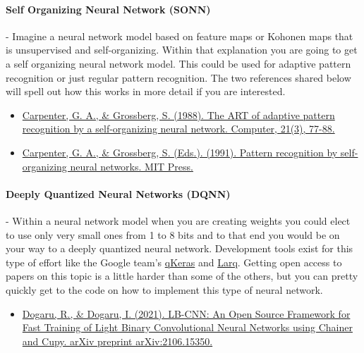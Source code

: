 \documentclass{article}
\begin{document}
\paragraph{Self Organizing Neural Network (SONN)} - Imagine a neural network model based on feature maps or Kohonen maps that is unsupervised and self-organizing. Within that explanation you are going to get a self organizing neural network model. This could be used for adaptive pattern recognition or just regular pattern recognition. The two references shared below will spell out how this works in more detail if you are interested. 

\begin{itemize}
\item \href{https://search.iczhiku.com/paper/bELWExDU1wAMpDkP.pdf}{Carpenter, G. A., \& Grossberg, S. (1988). The ART of adaptive pattern recognition by a self-organizing neural network. Computer, 21(3), 77-88.} \cite{carpenter1988art}
\item \href{https://www.google.com/books/edition/Pattern_Recognition_by_Self_organizing_N/2u1fH0mxfz0C?hl=en&gbpv=0}{Carpenter, G. A., \& Grossberg, S. (Eds.). (1991). Pattern recognition by self-organizing neural networks. MIT Press.} \cite{carpenter1988art}
\end{itemize}

\paragraph{Deeply Quantized Neural Networks (DQNN)} - Within a neural network model when you are creating weights you could elect to use only very small ones from 1 to 8 bits and to that end you would be on your way to a deeply quantized neural network. Development tools exist for this type of effort like the Google team’s \href{https://github.com/google/qkeras}{qKeras} and \href{https://github.com/larq/larq }{Larq}. Getting open access to papers on this topic is a little harder than some of the others, but you can pretty quickly get to the code on how to implement this type of neural network. 

\begin{itemize}
\item \href{https://arxiv.org/ftp/arxiv/papers/2106/2106.15350.pdf}{Dogaru, R., \& Dogaru, I. (2021). LB-CNN: An Open Source Framework for Fast Training of Light Binary Convolutional Neural Networks using Chainer and Cupy. arXiv preprint arXiv:2106.15350.} \cite{dogaru2021lb}
\end{itemize}
\end{document}
